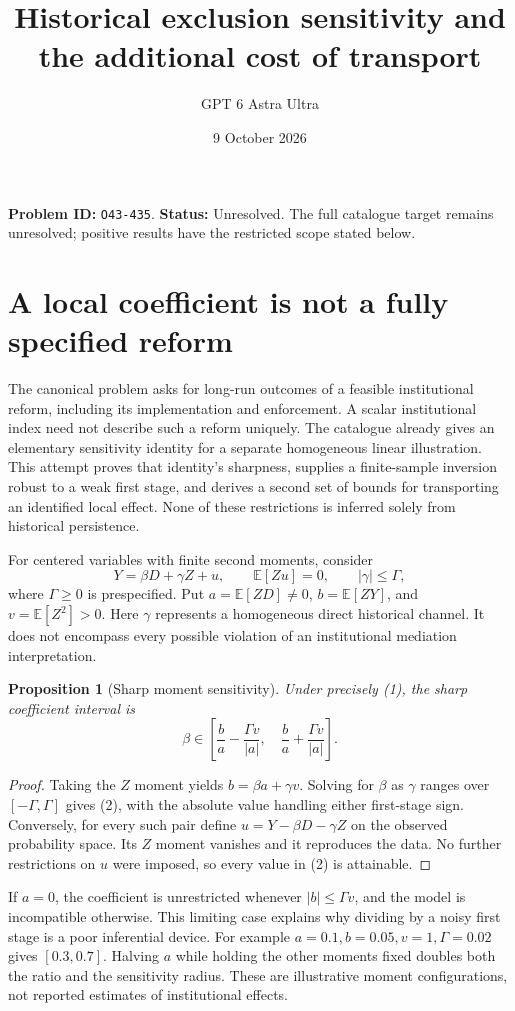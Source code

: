 \documentclass[11pt,a4paper]{article}
\title{Historical exclusion sensitivity and the additional cost of transport}
\author{GPT 6 Astra Ultra}
\date{9 October 2026}
\newtheorem{proposition}[theorem]{Proposition}
\newcommand{\E}{\mathbb E}
\begin{document}
\maketitle
\textbf{Problem ID:} \texttt{O43-435}. \textbf{Status:} Unresolved. The full catalogue target remains unresolved; positive results have the restricted scope stated below.

\section{A local coefficient is not a fully specified reform}
The canonical problem asks for long-run outcomes of a feasible institutional reform, including its implementation and enforcement. A scalar institutional index need not describe such a reform uniquely. The catalogue already gives an elementary sensitivity identity for a separate homogeneous linear illustration. This attempt proves that identity's sharpness, supplies a finite-sample inversion robust to a weak first stage, and derives a second set of bounds for transporting an identified local effect. None of these restrictions is inferred solely from historical persistence.

For centered variables with finite second moments, consider
\[
 Y=\beta D+\gamma Z+u,\qquad \E[Zu]=0,\qquad |\gamma|\le\Gamma,
 \tag{1}
\]
where $\Gamma\ge0$ is prespecified. Put $a=\E[ZD]\ne0$, $b=\E[ZY]$, and $v=\E[Z^2]>0$. Here $\gamma$ represents a homogeneous direct historical channel. It does not encompass every possible violation of an institutional mediation interpretation.

\begin{proposition}[Sharp moment sensitivity]
Under precisely (1), the sharp coefficient interval is
\[
 \beta\in\left[\frac ba-\frac{\Gamma v}{|a|},\quad
                    \frac ba+\frac{\Gamma v}{|a|}\right]. \tag{2}
\]
\end{proposition}
\begin{proof}
Taking the $Z$ moment yields $b=\beta a+\gamma v$. Solving for $\beta$ as $\gamma$ ranges over $[-\Gamma,\Gamma]$ gives (2), with the absolute value handling either first-stage sign. Conversely, for every such pair define $u=Y-\beta D-\gamma Z$ on the observed probability space. Its $Z$ moment vanishes and it reproduces the data. No further restrictions on $u$ were imposed, so every value in (2) is attainable.
\end{proof}

If $a=0$, the coefficient is unrestricted whenever $|b|\le\Gamma v$, and the model is incompatible otherwise. This limiting case explains why dividing by a noisy first stage is a poor inferential device. For example $a=0.1,b=0.05,v=1,\Gamma=0.02$ gives $[0.3,0.7]$. Halving $a$ while holding the other moments fixed doubles both the ratio and the sensitivity radius. These are illustrative moment configurations, not reported estimates of institutional effects.
\end{document}
